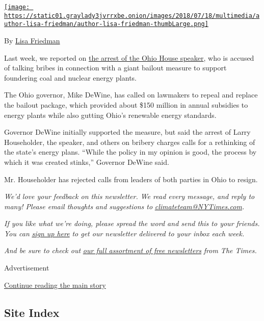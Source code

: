 \href{https://www.nytimes3xbfgragh.onion/by/lisa-friedman}{\texttt{[image: https://static01.graylady3jvrrxbe.onion/images/2018/07/18/multimedia/author-lisa-friedman/author-lisa-friedman-thumbLarge.png]}}

By \href{https://www.nytimes3xbfgragh.onion/by/lisa-friedman}{Lisa
Friedman}

Last week, we reported on
\href{https://www.nytimes3xbfgragh.onion/2020/07/22/climate/nyt-climate-newsletter-premature-babies.html}{the
arrest of the Ohio House speaker}, who is accused of talking bribes in
connection with a giant bailout measure to support foundering coal and
nuclear energy plants.

The Ohio governor, Mike DeWine, has called on lawmakers to repeal and
replace the bailout package, which provided about \$150 million in
annual subsidies to energy plants while also gutting Ohio's renewable
energy standards.

Governor DeWine initially supported the measure, but said the arrest of
Larry Householder, the speaker, and others on bribery charges calls for
a rethinking of the state's energy plans. ``While the policy in my
opinion is good, the process by which it was created stinks,'' Governor
DeWine said.

Mr. Householder has rejected calls from leaders of both parties in Ohio
to resign.

\emph{We'd love your feedback on this newsletter. We read every message,
and reply to many! Please email thoughts and suggestions to}
\href{mailto:climateteam@NYTimes.com?subject=Newsletter\%20Feedback}{\emph{climateteam@NYTimes.com}}\emph{.}

\emph{If you like what we're doing, please spread the word and send this
to your friends. You can}
\href{https://www.nytimes3xbfgragh.onion/newsletters/climate-change}{\emph{sign
up here}} \emph{to get our newsletter delivered to your inbox each
week.}

\emph{And be sure to check out}
\href{https://www.nytimes3xbfgragh.onion/newsletters}{\emph{our full
assortment of free newsletters}} \emph{from The Times.}

Advertisement

\protect\hyperlink{after-bottom}{Continue reading the main story}

\hypertarget{site-index}{%
\subsection{Site Index}\label{site-index}}

